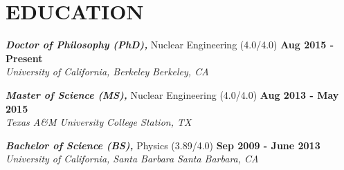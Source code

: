 \section{\small{EDUCATION}}

{\sl\bf Doctor of Philosophy (PhD),} Nuclear Engineering (4.0/4.0) \hfill {\bf Aug 2015 - Present} \\
{\sl University of California, Berkeley} \hfill {\sl Berkeley, CA}
\vspace{-5pt}

{\sl\bf Master of Science (MS),} Nuclear Engineering (4.0/4.0) \hfill {\bf Aug 2013 - May 2015} \\
{\sl Texas A\&M University} \hfill {\sl College Station, TX}
\vspace{-5pt}

{\sl\bf Bachelor of Science (BS),} Physics (3.89/4.0) \hfill {\bf Sep 2009 - June 2013} \\
{\sl University of California, Santa Barbara} \hfill {\sl Santa Barbara, CA}
